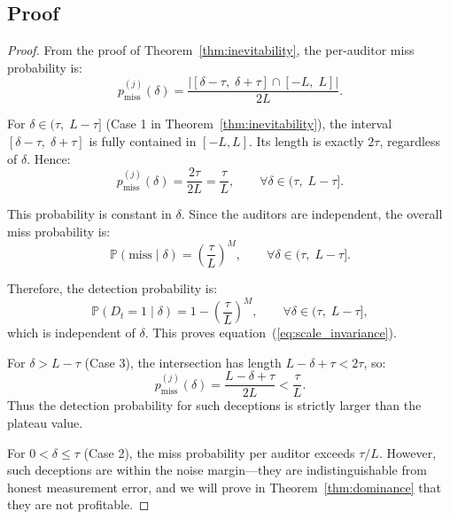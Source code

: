 \documentclass[11pt,a4paper]{article}
\theoremstyle{definition}
\theoremstyle{remark}
\newcommand{\Pbb}{\mathbb{P}}
\newcommand{\abs}[1]{\left|#1\right|}
\newcommand{\deception}{\delta}
\newcommand{\threshold}{\tau}
\newcommand{\tol}{L}
\begin{document}
\subsection{Proof}

\begin{proof}
From the proof of Theorem~\ref{thm:inevitability}, the per-auditor miss probability is:
\begin{equation}
    p_{\text{miss}}^{(j)}(\deception) =
    \frac{\abs{[\deception - \threshold,\; \deception + \threshold] \cap [-\tol,\; \tol]}}{2\tol}.
\end{equation}

For $\deception \in (\threshold,\; \tol - \threshold]$ (Case 1 in Theorem~\ref{thm:inevitability}), the interval $[\deception - \threshold,\; \deception + \threshold]$ is fully contained in $[-\tol, \tol]$. Its length is exactly $2\threshold$, regardless of $\deception$. Hence:
\begin{equation}
    p_{\text{miss}}^{(j)}(\deception) = \frac{2\threshold}{2\tol} = \frac{\threshold}{\tol},
    \qquad \forall \deception \in (\threshold,\; \tol - \threshold].
\end{equation}

This probability is constant in $\deception$. Since the auditors are independent, the overall miss probability is:
\begin{equation}
    \Pbb(\text{miss} \mid \deception) = \left(\frac{\threshold}{\tol}\right)^M,
    \qquad \forall \deception \in (\threshold,\; \tol - \threshold].
\end{equation}

Therefore, the detection probability is:
\begin{equation}
    \Pbb(D_t = 1 \mid \deception) = 1 - \left(\frac{\threshold}{\tol}\right)^M,
    \qquad \forall \deception \in (\threshold,\; \tol - \threshold],
\end{equation}
which is independent of $\deception$. This proves equation~(\ref{eq:scale_invariance}).

For $\deception > \tol - \threshold$ (Case 3), the intersection has length $\tol - \deception + \threshold < 2\threshold$, so:
\begin{equation}
    p_{\text{miss}}^{(j)}(\deception) = \frac{\tol - \deception + \threshold}{2\tol}
    < \frac{\threshold}{\tol}.
\end{equation}
Thus the detection probability for such deceptions is strictly larger than the plateau value.

For $0 < \deception \leq \threshold$ (Case 2), the miss probability per auditor exceeds $\threshold/\tol$. However, such deceptions are within the noise margin---they are indistinguishable from honest measurement error, and we will prove in Theorem~\ref{thm:dominance} that they are not profitable.


\end{proof}
\end{document}
